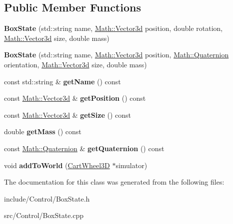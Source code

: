 \subsection*{Public Member Functions}
\begin{DoxyCompactItemize}
\item 
\hypertarget{classCartWheel_1_1BoxState_a23f0dfccffd0bdc93d12c1b853337e63}{
{\bfseries BoxState} (std::string name, \hyperlink{classCartWheel_1_1Math_1_1Vector3d}{Math::Vector3d} position, double rotation, \hyperlink{classCartWheel_1_1Math_1_1Vector3d}{Math::Vector3d} size, double mass)}
\label{classCartWheel_1_1BoxState_a23f0dfccffd0bdc93d12c1b853337e63}

\item 
\hypertarget{classCartWheel_1_1BoxState_a49d0907f77d3388ab82c10ae46858432}{
{\bfseries BoxState} (std::string name, \hyperlink{classCartWheel_1_1Math_1_1Vector3d}{Math::Vector3d} position, \hyperlink{classCartWheel_1_1Math_1_1Quaternion}{Math::Quaternion} orientation, \hyperlink{classCartWheel_1_1Math_1_1Vector3d}{Math::Vector3d} size, double mass)}
\label{classCartWheel_1_1BoxState_a49d0907f77d3388ab82c10ae46858432}

\item 
\hypertarget{classCartWheel_1_1BoxState_ac1458bfadcdbd487d68ab7576a6ff7c6}{
const std::string \& {\bfseries getName} () const }
\label{classCartWheel_1_1BoxState_ac1458bfadcdbd487d68ab7576a6ff7c6}

\item 
\hypertarget{classCartWheel_1_1BoxState_a8f798b94be212085f6c0358a2e1e4edc}{
const \hyperlink{classCartWheel_1_1Math_1_1Vector3d}{Math::Vector3d} \& {\bfseries getPosition} () const }
\label{classCartWheel_1_1BoxState_a8f798b94be212085f6c0358a2e1e4edc}

\item 
\hypertarget{classCartWheel_1_1BoxState_ac56f116e4c8c861984aa683616a99665}{
const \hyperlink{classCartWheel_1_1Math_1_1Vector3d}{Math::Vector3d} \& {\bfseries getSize} () const }
\label{classCartWheel_1_1BoxState_ac56f116e4c8c861984aa683616a99665}

\item 
\hypertarget{classCartWheel_1_1BoxState_a2120fe6473027396873fb02f55fa7d2e}{
double {\bfseries getMass} () const }
\label{classCartWheel_1_1BoxState_a2120fe6473027396873fb02f55fa7d2e}

\item 
\hypertarget{classCartWheel_1_1BoxState_a97192622940973de506065795354bb71}{
const \hyperlink{classCartWheel_1_1Math_1_1Quaternion}{Math::Quaternion} \& {\bfseries getQuaternion} () const }
\label{classCartWheel_1_1BoxState_a97192622940973de506065795354bb71}

\item 
\hypertarget{classCartWheel_1_1BoxState_aed6d9229982f0e4446cb9c3a91104bd8}{
void {\bfseries addToWorld} (\hyperlink{classCartWheel_1_1CartWheel3D}{CartWheel3D} $\ast$simulator)}
\label{classCartWheel_1_1BoxState_aed6d9229982f0e4446cb9c3a91104bd8}

\end{DoxyCompactItemize}


The documentation for this class was generated from the following files:\begin{DoxyCompactItemize}
\item 
include/Control/BoxState.h\item 
src/Control/BoxState.cpp\end{DoxyCompactItemize}
